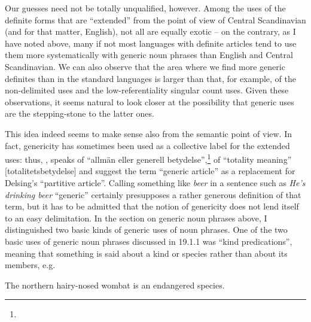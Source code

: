 \begin{styleBodytextC}
Our guesses need not be totally unqualified, however. Among the uses of the definite forms that are “extended” from the point of view of Central Scandinavian (and for that matter, English), not all are equally exotic – on the contrary, as I have noted above, many if not most languages with definite articles tend to use them more systematically with generic noun phrases than English and Central Scandinavian. We can also observe that the area where we find more generic definites than in the standard languages is larger than that, for example, of the non-delimited uses and the low-referentiality singular count uses. Given these observations, it seems natural to look closer at the possibility that generic uses are the stepping-stone to the latter ones. 

\end{styleBodytextC}

\begin{styleBodytextC}
This idea indeed seems to make sense also from the semantic point of view. In fact, genericity has sometimes been used as a collective label for the extended uses: thus, \citet[134]{Hummelstedt1934}, speaks of “allmän eller generell betydelse”,\footnote{} \citet[29]{Marklund1976} of “totality meaning” [totalitetsbetydelse] and \citet{BergholmEtAl1999} suggest the term “generic article” as a replacement for Delsing’s “partitive article”. Calling something like \textit{beer} in a sentence such as \textit{He’s drinking beer} “generic” certainly presupposes a rather generous definition of that term, but it has to be admitted that the notion of genericity does not lend itself to an easy delimitation. In the section on generic noun phrases above, I distinguished two basic kinds of generic uses of noun phrases. One of the two basic uses of generic noun phrases discussed in 19.1.1 was “kind predications”, meaning that something is said about a kind or species rather than about its members, e.g. 

\end{styleBodytextC}

\begin{listWWNumileveli}
\item {}

\begin{styleExample}
The northern hairy-nosed wombat is an endangered species. 

\end{styleExample}

\end{listWWNumileveli}

